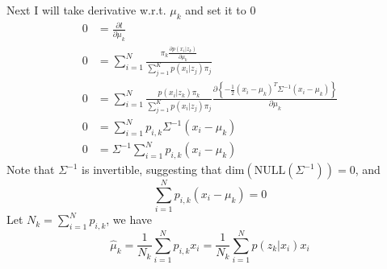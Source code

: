 \documentclass[12pt,oneside,a4paper]{article}
\begin{document}
Next I will take derivative w.r.t. $\mu_{k}$ and set it to 0
\begin{equation*}
\begin{aligned}
0 &= \frac{\partial l}{\partial \mu_{k}}\\
0 &=\sum_{i = 1}^{N}\frac{\pi_{k}\frac{\partial p(x_{i}|z_{k})}{\partial \mu_{k}}}{\sum_{j = 1}^{K}p(x_{i}|z_{j})\pi_{j}} \\
0 &=\sum_{i = 1}^{N}\frac{p(x_{i}|z_{k})\pi_{k}}{\sum_{j = 1}^{K}p(x_{i}|z_{j})\pi_{j}}\frac{\partial\left\{ -\frac{1}{2}(x_{i} - \mu_k)^{T}\Sigma^{-1}(x_{i} - \mu_k)\right\}}{\partial \mu_{k}}\\
0 &= \sum_{i = 1}^{N}p_{i, k}\Sigma^{-1}(x_{i} - \mu_{k})\\
0 &= \Sigma^{-1}\sum_{i = 1}^{N}p_{i,k}(x_{i} - \mu_{k})
\end{aligned}
\end{equation*}
Note that $\Sigma^{-1}$ is invertible, suggesting that $\mathrm{dim}(\mathrm{NULL}(\Sigma^{-1})) = 0$, and
$$\sum_{i = 1}^{N}p_{i,k}(x_{i} - \mu_{k}) = 0$$
Let $N_{k} = \sum_{i = 1}^{N}p_{i,k}$, we have
$$\hat{\mu}_{k} = \frac{1}{N_{k}}\sum_{i = 1}^{N}p_{i,k}x_{i} = \frac{1}{N_{k}}\sum_{i = 1}^{N}p(z_{k}|x_{i})x_{i}$$
\end{document}

